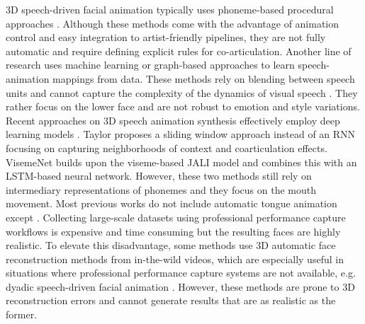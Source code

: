 \documentclass[10pt,twocolumn,letterpaper]{article}
\begin{document}
3D speech-driven facial animation typically uses phoneme-based procedural approaches \cite{jali, Charalambous2019}. Although these methods come with the advantage of animation control and easy integration to artist-friendly pipelines, they are not fully automatic and require defining explicit rules for co-articulation. Another line of research uses machine learning \cite{Taylor2012} or graph-based approaches \cite{Cao2005} to learn speech-animation mappings from data. These methods rely on blending between speech units and cannot capture the complexity of the dynamics of visual speech \cite{Taylor2017}. They rather focus on the lower face and are not robust to emotion and style variations. Recent approaches on 3D speech animation synthesis effectively employ deep learning models \cite{Taylor2017, TeroKarras, MeshTalk, visemenet2018, VOCA2019, faceformer2022, Voice2FaceEA}. Taylor \etal\cite{Taylor2017} proposes a sliding window approach instead of an RNN focusing on capturing neighborhoods of context and coarticulation effects. VisemeNet \cite{visemenet2018} builds upon the viseme-based JALI\cite{jali} model and combines this with an LSTM-based neural network. However, these two methods \cite{Taylor2017, visemenet2018} still rely on intermediary representations of phonemes and they focus on the mouth movement. Most previous works do not include automatic tongue animation except \cite{Voice2FaceEA}. Collecting large-scale datasets using professional performance capture workflows is expensive and time consuming but the resulting faces are highly realistic. To elevate this disadvantage, some methods use 3D automatic face reconstruction methods from in-the-wild videos, which are especially useful in situations where professional performance capture systems are not available, e.g. dyadic speech-driven facial animation \cite{jonell2020letsfaceit, ng2022learning2listen}. However, these methods are prone to 3D reconstruction errors and cannot generate results that are as realistic as the former.


 
\end{document}
